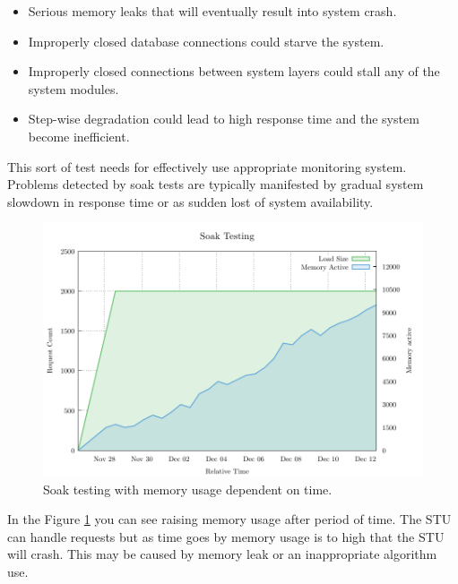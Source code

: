 \begin{itemize}
	\setlength\itemsep{0em}
	\item Serious memory leaks that will eventually result into system crash.
	\item Improperly closed database connections could starve the system.
	\item Improperly closed connections between system layers could stall any of the system modules.
	\item Step-wise degradation could lead to high response time and the system become inefficient.
\end{itemize}

This sort of test needs for effectively use appropriate monitoring system. Problems detected by soak tests are typically manifested by gradual system slowdown in response time or as sudden lost of system availability.

\begin{figure}[H]
  \centering
  \includegraphics[width=15cm]{obrazky-figures/soak_testing.pdf}
  \caption{Soak testing with memory usage dependent on time.}
  \label{fig:soak_test}
\end{figure}

In the Figure \ref{fig:soak_test} you can see raising memory usage after period of time. The STU can handle requests but as time goes by memory usage is to high that the STU will crash. This may be caused by memory leak or an inappropriate algorithm use.


